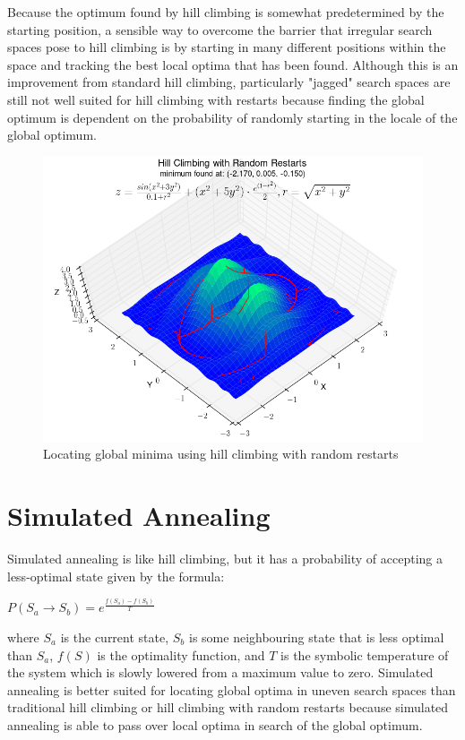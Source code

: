 \documentclass[10pt,a4paper,titlepage]{article}
\begin{document}
Because the optimum found by hill climbing is somewhat predetermined by the starting position, a sensible way to overcome the barrier that irregular search spaces pose to hill climbing is by starting in many different positions within the space and tracking the best local optima that has been found.  Although this is an improvement from standard hill climbing, particularly "jagged" search spaces are still not well suited for hill climbing with restarts because finding the global optimum is dependent on the probability of randomly starting in the locale of the global optimum.

\begin{figure}[!ht]
  \centering
    \includegraphics[width=\textwidth]{random_restarts.png}
    \caption{Locating global minima using hill climbing with random restarts}
\end{figure}

\newpage
\section{Simulated Annealing}

Simulated annealing is like hill climbing, but it has a probability of accepting a less-optimal state given by the formula:

\LARGE
\begin{center}
$P(S_a \rightarrow S_b) = e^\frac{f(S_a) - f(S_b)}{T}$
\end{center}

\normalsize
where $S_a$ is the current state, $S_b$ is some neighbouring state that is less optimal than $S_a$, $f(S)$ is the optimality function, and $T$ is the symbolic temperature of the system which is slowly lowered from a maximum value to zero.  Simulated annealing is better suited for locating global optima in uneven search spaces than traditional hill climbing or hill climbing with random restarts because simulated annealing is able to pass over local optima in search of the global optimum.
\end{document}
